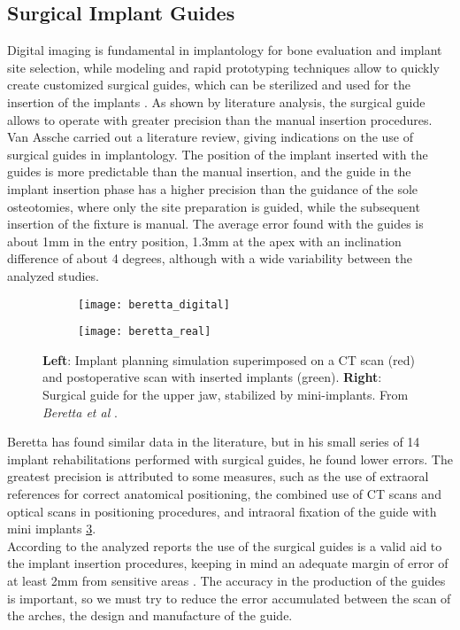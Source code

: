 \subsection{Surgical Implant Guides}
Digital imaging is fundamental in implantology for bone evaluation and implant site selection, while modeling and rapid prototyping techniques allow to quickly create customized surgical guides, which can be sterilized and used for the insertion of the implants \parencite{Reference83}. As shown by literature analysis, the surgical guide allows to operate with greater precision than the manual insertion procedures. Van Assche \parencite{Reference105} carried out a literature review, giving indications on the use of surgical guides in implantology. The position of the implant inserted with the guides is more predictable than the manual insertion, and the guide in the implant insertion phase has a higher precision than the guidance of the sole osteotomies, where only the site preparation is guided, while the subsequent insertion of the fixture is manual. The average error found with the guides is about 1mm in the entry position, 1.3mm at the apex with an inclination difference of about 4 degrees, although with a wide variability between the analyzed studies.

\begin{figure}[h!]
 
\begin{subfigure}{0.5\textwidth}
\centering
\texttt{[image: beretta\_digital]} 
\label{fig:beretta_digital}
\end{subfigure}
\begin{subfigure}{0.5\textwidth}
\centering
\texttt{[image: beretta\_real]}
\label{fig:beretta_real}
\end{subfigure}

\caption{\textbf{Left}: Implant planning simulation superimposed on a CT scan (red) and postoperative scan with inserted implants (green). \textbf{Right}: Surgical guide for the upper jaw, stabilized by mini-implants. From \emph{Beretta et al} \parencite{Reference104}.}
\label{fig:Beretta}
\end{figure}

Beretta \parencite{Reference104} has found similar data in the literature, but in his small series of 14 implant rehabilitations performed with surgical guides, he found lower errors. The greatest precision is attributed to some measures, such as the use of extraoral references for correct anatomical positioning, the combined use of CT scans and optical scans in positioning procedures, and intraoral fixation of the guide with mini implants \ref{fig:Beretta}. \\
According to the analyzed reports the use of the surgical guides is a valid aid to the implant insertion procedures, keeping in mind an adequate margin of error of at least 2mm from sensitive areas \parencite{Reference104}. The accuracy in the production of the guides is important, so we must try to reduce the error accumulated between the scan of the arches, the design and manufacture of the guide.
 
